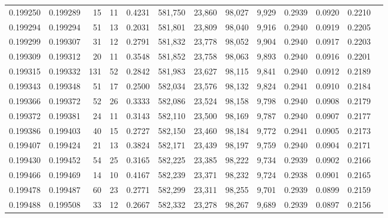 \begin{tabular}{rrrrrrrrrrrrr}
0.199250 & 0.199289 &    15 &  11 &                                     0.4231 & 581,750 &  23,860 &  98,027 &   9,929 & 0.2939 & 0.0920 & 0.2210 \\
0.199294 & 0.199294 &    51 &  13 &                                     0.2031 & 581,801 &  23,809 &  98,040 &   9,916 & 0.2940 & 0.0919 & 0.2205 \\
0.199299 & 0.199307 &    31 &  12 &                                     0.2791 & 581,832 &  23,778 &  98,052 &   9,904 & 0.2940 & 0.0917 & 0.2203 \\
0.199309 & 0.199312 &    20 &  11 &                                     0.3548 & 581,852 &  23,758 &  98,063 &   9,893 & 0.2940 & 0.0916 & 0.2201 \\
0.199315 & 0.199332 &   131 &  52 &                                     0.2842 & 581,983 &  23,627 &  98,115 &   9,841 & 0.2940 & 0.0912 & 0.2189 \\
0.199343 & 0.199348 &    51 &  17 &                                     0.2500 & 582,034 &  23,576 &  98,132 &   9,824 & 0.2941 & 0.0910 & 0.2184 \\
0.199366 & 0.199372 &    52 &  26 &                                     0.3333 & 582,086 &  23,524 &  98,158 &   9,798 & 0.2940 & 0.0908 & 0.2179 \\
0.199372 & 0.199381 &    24 &  11 &                                     0.3143 & 582,110 &  23,500 &  98,169 &   9,787 & 0.2940 & 0.0907 & 0.2177 \\
0.199386 & 0.199403 &    40 &  15 &                                     0.2727 & 582,150 &  23,460 &  98,184 &   9,772 & 0.2941 & 0.0905 & 0.2173 \\
0.199407 & 0.199424 &    21 &  13 &                                     0.3824 & 582,171 &  23,439 &  98,197 &   9,759 & 0.2940 & 0.0904 & 0.2171 \\
0.199430 & 0.199452 &    54 &  25 &                                     0.3165 & 582,225 &  23,385 &  98,222 &   9,734 & 0.2939 & 0.0902 & 0.2166 \\
0.199466 & 0.199469 &    14 &  10 &                                     0.4167 & 582,239 &  23,371 &  98,232 &   9,724 & 0.2938 & 0.0901 & 0.2165 \\
0.199478 & 0.199487 &    60 &  23 &                                     0.2771 & 582,299 &  23,311 &  98,255 &   9,701 & 0.2939 & 0.0899 & 0.2159 \\
0.199488 & 0.199508 &    33 &  12 &                                     0.2667 & 582,332 &  23,278 &  98,267 &   9,689 & 0.2939 & 0.0897 & 0.2156 \\

\end{tabular}
